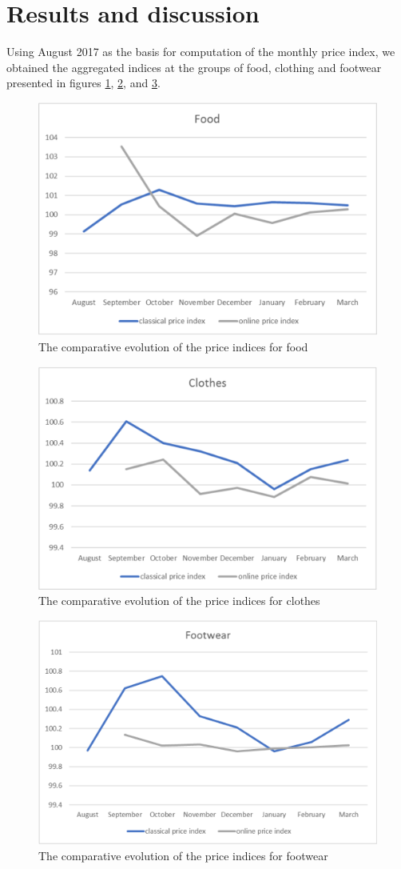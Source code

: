 \documentclass[]{article}
\begin{document}
\section{Results and discussion } \label{results}

Using August 2017 as the basis for computation of the monthly price index, we obtained the aggregated indices at the 
groups of food, clothing and footwear presented in figures \ref{fig:3}, \ref{fig:4}, and \ref{fig:5}.


\begin{figure}
\centering
\includegraphics[width=0.7\linewidth]{fig3.eps}
\caption{The comparative evolution of the price indices for food}
\label{fig:3}
\end{figure}


\begin{figure}
\centering
\includegraphics[width=0.7\linewidth]{fig4.eps}
\caption{The comparative evolution of the price indices for clothes}
\label{fig:4}
\end{figure}


\begin{figure}
\centering
\includegraphics[width=0.7\linewidth]{fig5.eps}
\caption{The comparative evolution of the price indices for footwear}
\label{fig:5}
\end{figure}
\end{document}
